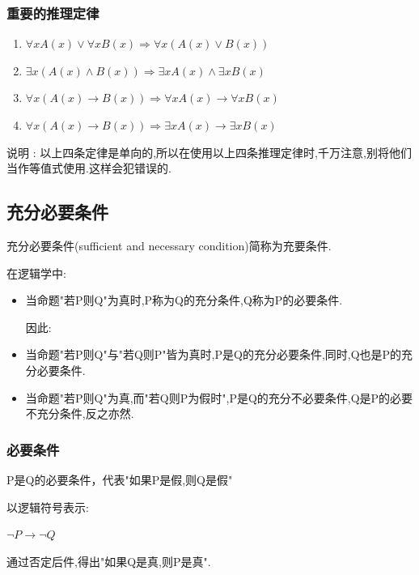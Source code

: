 \documentclass[UTF8,12pt]{ctexbook}
\begin{document}
{{{{    \subsubsection{重要的推理定律}{
      \begin{enumerate}
        \item $\forall x A(x) \lor \forall x B(x) \Rightarrow \forall x (A(x) \lor B(x))$
        \item $\exists x (A(x) \land B(x)) \Rightarrow \exists x A(x) \land \exists x B(x)$
        \item $\forall x (A(x) \to B(x)) \Rightarrow \forall x A(x) \to \forall x B(x)$
        \item $\forall x (A(x) \to B(x)) \Rightarrow \exists x A(x) \to \exists x B(x)$
      \end{enumerate}

      说明 : 以上四条定律是单向的,所以在使用以上四条推理定律时,千万注意,别将他们当作等值式使用.这样会犯错误的.
    }%

    }%

    \subsection{充分必要条件}{

      充分必要条件(sufficient and necessary condition)简称为充要条件.

      在逻辑学中:
      \begin{itemize}
        \item 当命题"若P则Q"为真时,P称为Q的充分条件,Q称为P的必要条件.

              因此:

        \item 当命题"若P则Q"与"若Q则P"皆为真时,P是Q的充分必要条件,同时,Q也是P的充分必要条件.
        \item 当命题"若P则Q"为真,而"若Q则P为假时",P是Q的充分不必要条件,Q是P的必要不充分条件,反之亦然.
      \end{itemize}

      \subsubsection{必要条件}{
        P是Q的必要条件，代表"如果P是假,则Q是假"

        以逻辑符号表示:

        $\lnot P \to \lnot Q$

        通过否定后件,得出"如果Q是真,则P是真".

}}}}}
\end{document}
